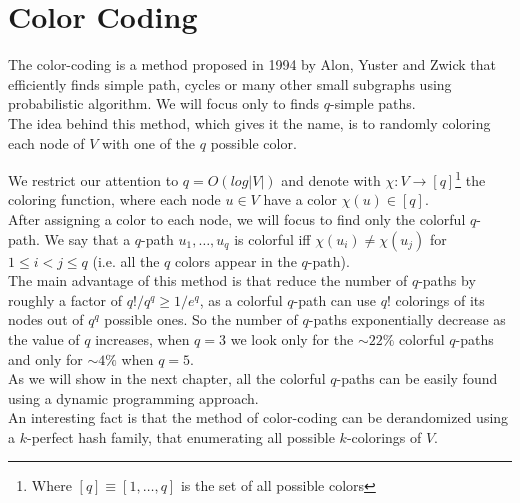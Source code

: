 \section{Color Coding}

The color-coding is a method proposed in 1994 by Alon, Yuster and Zwick that efficiently finds simple path, cycles or many other small subgraphs using probabilistic algorithm. We will focus only to finds $q$-simple paths.\\

The idea behind this method, which gives it the name, is to randomly coloring each node of $V$ with one of the $q$ possible color.

We restrict our attention to $q = O(log |V|)$ and denote with $\chi : V \rightarrow [q]$\footnote{Where $[q] \equiv [1, \ldots, q]$ is the set of all possible colors} the coloring function, where each node $u \in V$ have a color $\chi(u) \in [q]$.\\

After assigning a color to each node, we will focus to find only the colorful $q$-path. We say that a $q$-path $u_{1}, \ldots, u_{q}$ is colorful iff $\chi(u_{i}) \neq \chi(u_{j})$ for $1 \leq i < j \leq q$ (i.e. all the $q$ colors appear in the $q$-path).\\

The main advantage of this method is that reduce the number of $q$-paths by roughly a factor of $q! / q^{q} \geq 1/e^{q}$, as a colorful $q$-path can use $q!$ colorings of its nodes out of $q^{q}$ possible ones. So the number of $q$-paths exponentially decrease as the value of $q$ increases, when $q = 3$ we look only for the $\sim22\%$ colorful $q$-paths and only for $\sim4\%$ when $q = 5$.\\

As we will show in the next chapter, all the colorful $q$-paths can be easily found using a dynamic programming approach.\\

An interesting fact is that the method of color-coding can be derandomized using a $k$-perfect hash family, that enumerating all possible $k$-colorings of $V$.

